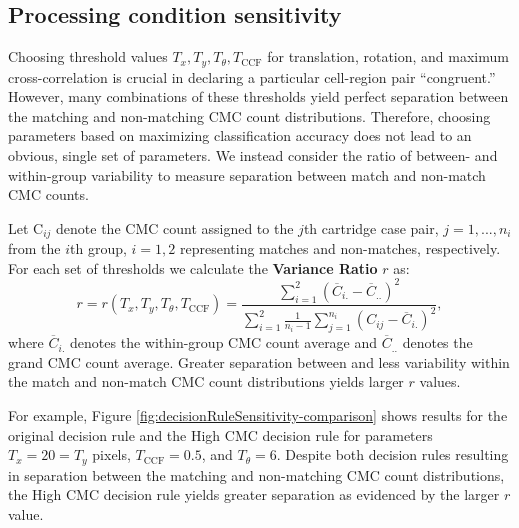 \hypertarget{processing-condition-sensitivity}{%
\subsection{Processing condition sensitivity}\label{processing-condition-sensitivity}}

Choosing threshold values \(T_x, T_y, T_\theta, T_{\text{CCF}}\) for translation, rotation, and maximum cross-correlation is crucial in declaring a particular cell-region pair ``congruent.''
However, many combinations of these thresholds yield perfect separation between the matching and non-matching CMC count distributions.
Therefore, choosing parameters based on maximizing classification accuracy does not lead to an obvious, single set of parameters.
We instead consider the ratio of between- and within-group variability to measure separation between match and non-match CMC counts.

Let C\(_{ij}\) denote the CMC count assigned to the \(j\)th cartridge case pair, \(j = 1,...,n_i\) from the \(i\)th group, \(i = 1,2\) representing matches and non-matches, respectively.
For each set of thresholds we calculate the \textbf{Variance Ratio} \(r\) as:
\[
r = r\left(T_x, T_y, T_\theta, T_{\text{CCF}}\right) = \frac{\sum_{i=1}^2 \left(\overline{C}_{i.} - \overline{C}_{..}\right)^2}{\sum_{i=1}^2 \frac{1}{n_i - 1}\sum_{j=1}^{n_i} \left(C_{ij} - \overline{C}_{i.}\right)^2},
\]
where \(\overline{C}_{i.}\) denotes the within-group CMC count average and \(\overline{C}_{..}\) denotes the grand CMC count average.
Greater separation between and less variability within the match and non-match CMC count distributions yields larger \(r\) values.

For example, Figure \ref{fig:decisionRuleSensitivity-comparison} shows results for the original decision rule and the High CMC decision rule for parameters \(T_x = 20 = T_y\) pixels, \(T_{\text{CCF}} = 0.5\), and \(T_{\theta} = 6\).
Despite both decision rules resulting in separation between the matching and non-matching CMC count distributions, the High CMC decision rule yields greater separation as evidenced by the larger \(r\) value.

